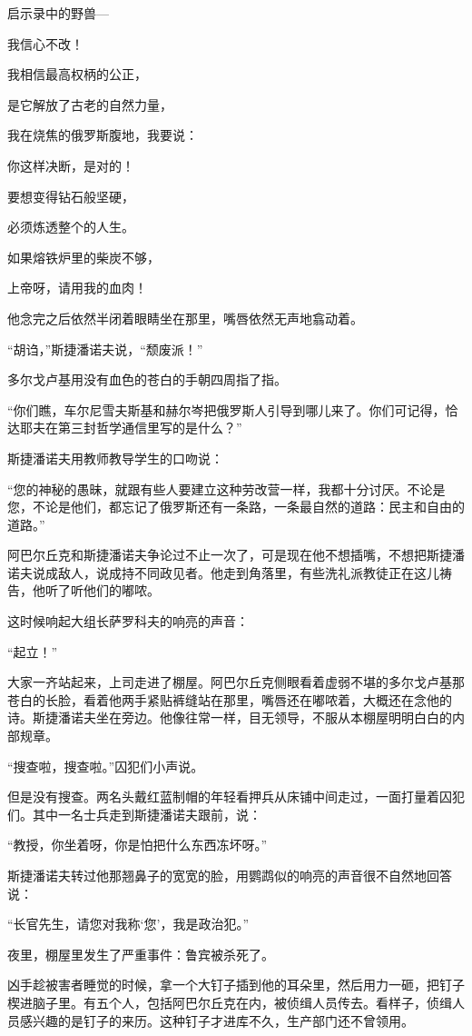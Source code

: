 启示录中的野兽—

我信心不改！

我相信最高权柄的公正，

是它解放了古老的自然力量，

我在烧焦的俄罗斯腹地，我要说：

你这样决断，是对的！

要想变得钻石般坚硬，

必须炼透整个的人生。

如果熔铁炉里的柴炭不够，

上帝呀，请用我的血肉！

他念完之后依然半闭着眼睛坐在那里，嘴唇依然无声地翕动着。

“胡诌，”斯捷潘诺夫说，“颓废派！”

多尔戈卢基用没有血色的苍白的手朝四周指了指。

“你们瞧，车尔尼雪夫斯基和赫尔岑把俄罗斯人引导到哪儿来了。你们可记得，恰达耶夫在第三封哲学通信里写的是什么？”

斯捷潘诺夫用教师教导学生的口吻说：

“您的神秘的愚昧，就跟有些人要建立这种劳改营一样，我都十分讨厌。不论是您，不论是他们，都忘记了俄罗斯还有一条路，一条最自然的道路：民主和自由的道路。”

阿巴尔丘克和斯捷潘诺夫争论过不止一次了，可是现在他不想插嘴，不想把斯捷潘诺夫说成敌人，说成持不同政见者。他走到角落里，有些洗礼派教徒正在这儿祷告，他听了听他们的嘟哝。

这时候响起大组长萨罗科夫的响亮的声音：

“起立！”

大家一齐站起来，上司走进了棚屋。阿巴尔丘克侧眼看着虚弱不堪的多尔戈卢基那苍白的长脸，看着他两手紧贴裤缝站在那里，嘴唇还在嘟哝着，大概还在念他的诗。斯捷潘诺夫坐在旁边。他像往常一样，目无领导，不服从本棚屋明明白白的内部规章。

“搜查啦，搜查啦。”囚犯们小声说。

但是没有搜查。两名头戴红蓝制帽的年轻看押兵从床铺中间走过，一面打量着囚犯们。其中一名士兵走到斯捷潘诺夫跟前，说：

“教授，你坐着呀，你是怕把什么东西冻坏呀。”

斯捷潘诺夫转过他那翘鼻子的宽宽的脸，用鹦鹉似的响亮的声音很不自然地回答说：

“长官先生，请您对我称‘您’，我是政治犯。”

夜里，棚屋里发生了严重事件：鲁宾被杀死了。

凶手趁被害者睡觉的时候，拿一个大钉子插到他的耳朵里，然后用力一砸，把钉子楔进脑子里。有五个人，包括阿巴尔丘克在内，被侦缉人员传去。看样子，侦缉人员感兴趣的是钉子的来历。这种钉子才进库不久，生产部门还不曾领用。

